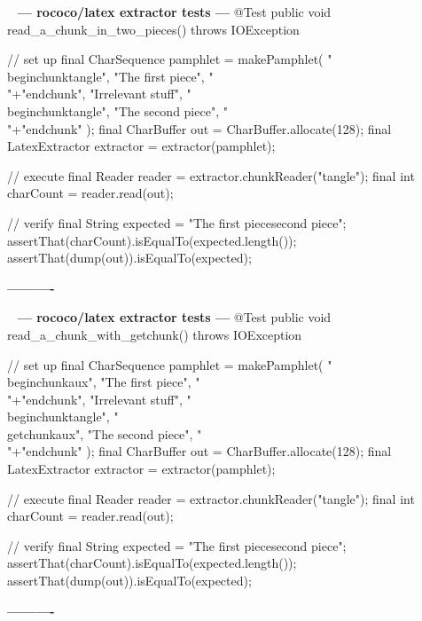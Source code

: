 \documentclass{book}
\newenvironment{chunk}[1]{%
{\ }\newline\noindent%
\hbox{\hskip 2.0cm}{\bf --- #1 ---}%
\verbatim}%                               say exactly what we see
{\endverbatim%
\par{}%
\noindent{}%
\hbox{\hskip 2.0cm}{\bf ----------}%
\par%
\normalsize\noindent}%
\providecommand{\getchunk}[1]{%
\noindent%
{\small $\backslash{}$begin\{chunk\}\{{\bf #1}\}}%
\index{{#1}}}
\begin{document}
\begin{chunk}{rococo/latex extractor tests}
@Test
public void read_a_chunk_in_two_pieces() throws IOException {
    // set up
    final CharSequence pamphlet = makePamphlet(
            "\\begin{chunk}{tangle}",
            "The first piece",
            "\\"+"end{chunk}",
            "Irrelevant stuff",
            "\\begin{chunk}{tangle}",
            "The second piece",
            "\\"+"end{chunk}"
    );
    final CharBuffer out = CharBuffer.allocate(128);
    final LatexExtractor extractor = extractor(pamphlet);

    // execute
    final Reader reader = extractor.chunkReader("tangle");
    final int charCount = reader.read(out);

    // verify
    final String expected = "The first piece\nThe second piece\n";
    assertThat(charCount).isEqualTo(expected.length());
    assertThat(dump(out)).isEqualTo(expected);
}
\end{chunk}

\begin{chunk}{rococo/latex extractor tests}
@Test
public void read_a_chunk_with_getchunk() throws IOException {
    // set up
    final CharSequence pamphlet = makePamphlet(
            "\\begin{chunk}{aux}",
            "The first piece",
            "\\"+"end{chunk}",
            "Irrelevant stuff",
            "\\begin{chunk}{tangle}",
            "\\getchunk{aux}",
            "The second piece",
            "\\"+"end{chunk}"
    );
    final CharBuffer out = CharBuffer.allocate(128);
    final LatexExtractor extractor = extractor(pamphlet);

    // execute
    final Reader reader = extractor.chunkReader("tangle");
    final int charCount = reader.read(out);

    // verify
    final String expected = "The first piece\nThe second piece\n";
    assertThat(charCount).isEqualTo(expected.length());
    assertThat(dump(out)).isEqualTo(expected);
}
\end{chunk}
\end{document}
